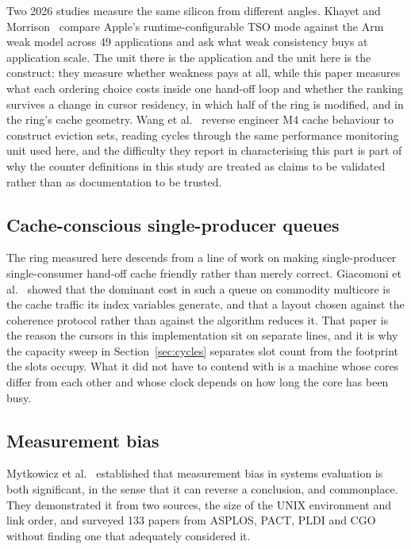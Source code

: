 \documentclass[conference]{IEEEtran}
\begin{document}
Two 2026 studies measure the same silicon from different angles. Khayet and
Morrison~\cite{khayet2026arm} compare Apple's runtime-configurable TSO mode
against the Arm weak model across 49 applications and ask what weak
consistency buys at application scale. The unit there is the application and
the unit here is the construct: they measure whether weakness pays at all,
while this paper measures what each ordering choice costs inside one hand-off
loop and whether the ranking survives a change in cursor residency, in which
half of the ring is modified, and in the ring's cache geometry. Wang et
al.~\cite{wang2026charting} reverse engineer M4 cache behaviour to construct
eviction sets, reading cycles through the same performance monitoring unit used
here, and the difficulty they report in characterising this part is part of why
the counter definitions in this study are treated as claims to be validated
rather than as documentation to be trusted.

\subsection{Cache-conscious single-producer queues}

The ring measured here descends from a line of work on making single-producer
single-consumer hand-off cache friendly rather than merely correct. Giacomoni
et al.~\cite{giacomoni2008fastforward} showed that the dominant cost in such a
queue on commodity multicore is the cache traffic its index variables generate,
and that a layout chosen against the coherence protocol rather than against the
algorithm reduces it. That paper is the reason the cursors in this
implementation sit on separate lines, and it is why the capacity sweep in
Section~\ref{sec:cycles} separates slot count from the footprint the slots
occupy. What it did not have to contend with is a machine whose cores differ
from each other and whose clock depends on how long the core has been busy.

\subsection{Measurement bias}

Mytkowicz et al.~\cite{mytkowicz2009wrong} established that measurement bias in
systems evaluation is both significant, in the sense that it can reverse a
conclusion, and commonplace. They demonstrated it from two sources, the size of
the UNIX environment and link order, and surveyed 133 papers from ASPLOS, PACT,
PLDI and CGO without finding one that adequately considered it.
\end{document}
